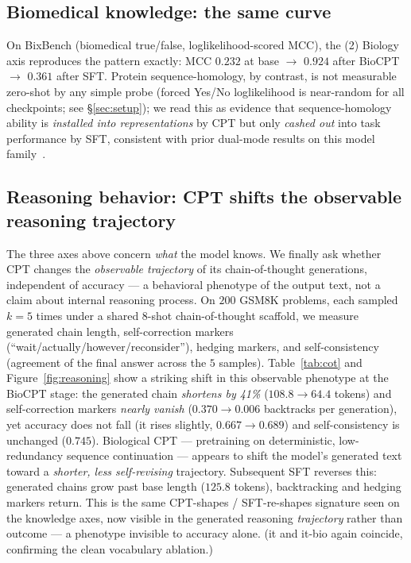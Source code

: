 \subsection{Biomedical knowledge: the same curve}
On BixBench (biomedical true/false, loglikelihood-scored MCC), the (2) Biology axis reproduces the
pattern exactly: MCC $0.232$ at base $\to$ $\mathbf{0.924}$ after BioCPT $\to$ $0.361$ after SFT.
Protein sequence-homology, by contrast, is not measurable zero-shot by any simple probe (forced
Yes/No loglikelihood is near-random for all checkpoints; see \S\ref{sec:setup}); we read this as
evidence that sequence-homology ability is \emph{installed into representations} by CPT but only
\emph{cashed out} into task performance by SFT, consistent with prior dual-mode results on this
model family~\citep{wang2026omnigene}.

\subsection{Reasoning behavior: CPT shifts the observable reasoning trajectory}
The three axes above concern \emph{what} the model knows. We finally ask whether CPT changes the
\emph{observable trajectory} of its chain-of-thought generations, independent of accuracy --- a
behavioral phenotype of the output text, not a claim about internal reasoning process. On $200$
GSM8K problems, each sampled $k{=}5$ times under a shared 8-shot chain-of-thought scaffold, we
measure generated chain length, self-correction markers (``wait/actually/however/reconsider''),
hedging markers, and self-consistency (agreement of the final answer across the $5$ samples).
Table~\ref{tab:cot} and Figure~\ref{fig:reasoning} show a striking shift in this observable
phenotype at the BioCPT stage: the generated chain \emph{shortens by 41\%} ($108.8\!\to\!64.4$
tokens) and self-correction markers \emph{nearly vanish} ($0.370\!\to\!0.006$ backtracks per
generation), yet accuracy does not fall (it rises slightly, $0.667\!\to\!0.689$) and
self-consistency is unchanged ($0.745$). Biological CPT --- pretraining on deterministic,
low-redundancy sequence continuation --- appears to shift the model's generated text toward a
\emph{shorter, less self-revising} trajectory. Subsequent SFT reverses this: generated chains
grow past base length ($125.8$ tokens), backtracking and hedging markers return. This is the
same CPT-shapes / SFT-re-shapes signature seen on the knowledge axes, now visible in the
generated reasoning \emph{trajectory} rather than outcome --- a phenotype invisible to accuracy
alone. (it and it-bio again coincide, confirming the clean vocabulary ablation.)

